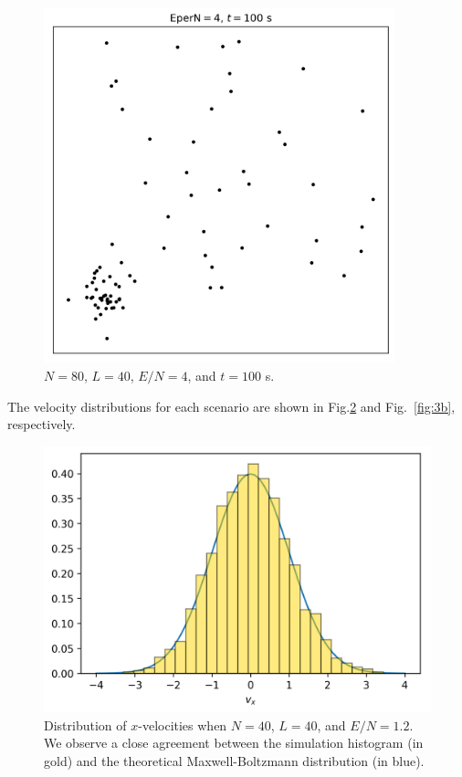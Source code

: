 \documentclass{article}
\begin{document}
\begin{figure}[H]
    \centering
    \includegraphics[width=4in]{homework8/p1b.png}
    \caption{$N=80$, $L=40$, $E/N=4$, and $t=100$ s.}
    \label{fig:1b}
\end{figure}

\bigskip
{}
\medskip



\bigskip
{}
\medskip

The velocity distributions for each scenario are shown in Fig.\ref{fig:3a} and Fig.~\ref{fig:3b}, respectively.

\begin{figure}[H]
    \centering
    \includegraphics[width=5in]{homework8/p3a.png}
    \caption{Distribution of $x$-velocities when $N=40$, $L=40$, and $E/N=1.2$. We observe a close agreement between the simulation histogram (in gold) and the theoretical Maxwell-Boltzmann distribution (in blue).}
    \label{fig:3a}
\end{figure}
\end{document}
